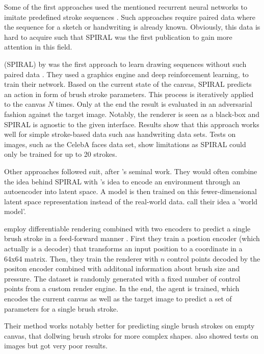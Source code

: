Some of the first approaches used the mentioned recurrent neural networks to imitate predefined stroke sequences \cite{sketchRNN, graves}.
Such approaches require paired data where the sequence for a sketch or handwriting is already known.
Obviously, this data is hard to acquire such that SPIRAL was the first publication to gain more attention in this field.

 (SPIRAL) by \citeauthor*{SPIRAL} was the first approach to learn drawing sequences without such paired data \cite{SPIRAL}.
They used a graphics engine and deep reinforcement learning, to train their network.
Based on the current state of the canvas, SPIRAL predicts an action in form of brush stroke parameters.
This process is iteratively applied to the canvas $N$ times.
Only at the end the result is evaluated in an adversarial fashion against the target image.
Notably, the renderer is seen as a black-box and SPIRAL is agnostic to the given interface.
Results show that this approach works well for simple stroke-based data such aas handwriting data sets.
Tests on images, such as the CelebA faces data set, show limitations as SPIRAL could only be trained for up to 20 strokes.


Other approaches followed suit, after \citeauthor*{SPIRAL}'s seminal work.
They would often combine the idea behind SPIRAL with \citeauthor{worldmodel}'s idea to encode an environment through an autoencoder into latent space.
A model is then trained on this fewer-dimensional latent space representation instead of the real-world data.
\citeauthor{worldmodel} call their idea a 'world model'.

\citeauthor*{strokenet} employ differentiable rendering combined with two encoders to predict a single brush stroke in a feed-forward manner \cite{strokenet}.
First they train a postion encoder (which actually is a decoder) that transforms an input position to a coordinate in a 64x64 matrix.
Then, they train the renderer with $n$ control points decoded by the positon encoder combined with additonal information about brush size and pressure.
The dataset is randomly generated with a fixed number of control points from a custom render engine.
In the end, the agent is trained, which encodes the current canvas as well as the target image to predict a set of parameters for a single brush stroke.

Their method works notably better for predicting single brush strokes on empty canvas, that dollwing brush stroks for more complex shapes.
\citeauthor*{strokenet} also showed tests on images but got very poor results.

